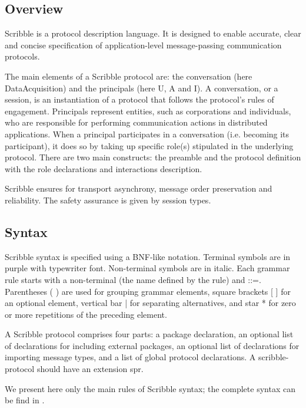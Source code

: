 \documentclass[a4paper,11pt,twoside]{report}
\begin{document}
\subsection{Overview}
Scribble is a protocol description language. It is designed to enable accurate, clear and concise specification of application-level message-passing communication protocols.

The main elements of a Scribble protocol are: the conversation (here DataAcquisition) and the principals (here U, A and I). A conversation, or a session, is an instantiation of a protocol that follows the protocol's rules of engagement. Principals represent entities, such as corporations and individuals, who are responsible for performing communication actions in distributed applications. When a principal participates in a conversation (i.e. becoming its participant), it does so by taking up specific role(s) stipulated in the underlying protocol. There are two main constructs: the preamble and the protocol definition with the role declarations and interactions description.

Scribble ensures for transport asynchrony, message order preservation and reliability. The safety assurance is given by session types.


\subsection{Syntax}
Scribble syntax is specified using a BNF-like notation. Terminal symbols are in purple with typewriter font. Non-terminal symbols are in italic. Each grammar rule starts with a non-terminal (the name defined by the rule) and ::=. Parentheses ( ) are used for grouping grammar elements, square brackets [ ] for an optional element, vertical bar | for separating alternatives, and star * for zero or more repetitions of the preceding element. 

A Scribble protocol comprises four parts: a package declaration, an optional list of declarations for including external packages, an optional list of declarations for importing message types, and a list of global protocol declarations. A scribble-protocol should have an extension spr.

We present here only the main rules of Scribble syntax; the complete syntax can be find in \cite{scribblelanguage}.
\end{document}
